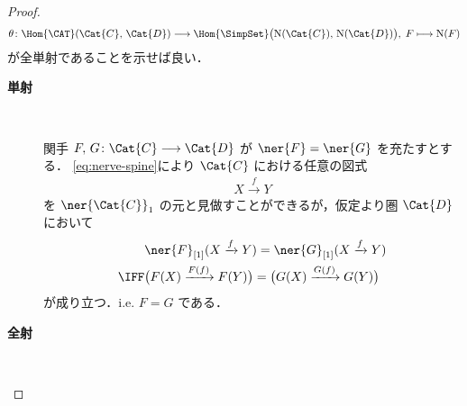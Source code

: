 \documentclass[TQFT_main]{subfiles}
\begin{document}
\begin{proof}
    \begin{align}
        \theta \colon \Hom{\CAT}(\Cat{C},\, \Cat{D}) \lto \Hom{\SimpSet} \bigl( \mathrm{N}(\Cat{C}),\, \mathrm{N}(\Cat{D}) \bigr),\; F \lmto \mathrm{N}(F)
    \end{align}
    が全単射であることを示せば良い．

    \begin{description}
        \item[\textbf{単射}]　
        
        関手 $F,\, G \colon \Cat{C} \lto \Cat{D}$ が $\ner{F} = \ner{G}$ を充たすとする．
        \eqref{eq:nerve-spine}により $\Cat{C}$ における任意の図式
        \begin{align}
            X \xrightarrow{f} Y
        \end{align}
        を $\ner{\Cat{C}}_1$ の元と見做すことができるが，仮定より圏 $\Cat{D}$ において
        \begin{align}
            &\ner{F}_{[1]}(X \xrightarrow{f} Y) = \ner{G}_{[1]}(X \xrightarrow{f} Y) \\
            \IFF & \bigl(F(X) \xrightarrow{F(f)} F(Y)\bigr) =  \bigl(G(X) \xrightarrow{G(f)} G(Y)\bigr)
        \end{align}
        が成り立つ．i.e. $F = G$ である．
        \item[\textbf{全射}]　
        

\end{description}
\end{proof}
\end{document}
